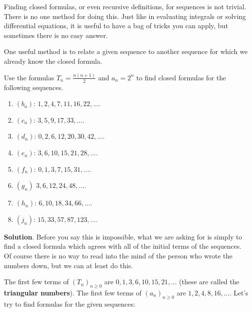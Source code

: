 \documentclass[11pt,]{book}
\newcommand{\terminology}[1]{\textbf{#1}}
\theoremstyle{ptxplainnotitle}
\theoremstyle{ptxplaintitle}
\theoremstyle{ptxdefinitionnotitle}
\theoremstyle{ptxdefinitiontitle}
\theoremstyle{ptxdefinitionnotitle}
\theoremstyle{ptxdefinitiontitle}
\theoremstyle{ptxdefinitionnotitle}
\theoremstyle{ptxdefinitiontitle}
\theoremstyle{ptxdefinitiontitlenonumber}
\theoremstyle{ptxdefinitiontitlenonumber}
\numberwithin{equation}{chapter}
\begin{document}
\hypertarget{p-57}{}%
Finding closed formulas, or even recursive definitions, for sequences is not trivial. There is no one method for doing this. Just like in evaluating integrals or solving differential equations, it is useful to have a bag of tricks you can apply, but sometimes there is no easy answer.%
\par
\hypertarget{p-58}{}%
One useful method is to relate a given sequence to another sequence for which we already know the closed formula.%
\begin{example}\label{example-4}
\hypertarget{p-59}{}%
Use the formulas \(T_n = \frac{n(n+1)}{2}\) and \(a_n = 2^n\) to find closed formulas for the following sequences. \leavevmode%
\begin{enumerate}
\item\hypertarget{li-34}{}\hypertarget{p-60}{}%
\((b_n)\): \(1, 2, 4, 7, 11, 16, 22, \ldots \).%
\item\hypertarget{li-35}{}\hypertarget{p-61}{}%
\((c_n)\): \(3, 5, 9, 17, 33,\ldots \).%
\item\hypertarget{li-36}{}\hypertarget{p-62}{}%
\((d_n)\): \(0, 2, 6, 12, 20, 30, 42,\ldots \).%
\item\hypertarget{li-37}{}\hypertarget{p-63}{}%
\((e_n)\): \(3, 6, 10, 15, 21, 28, \ldots\).%
\item\hypertarget{li-38}{}\hypertarget{p-64}{}%
\((f_n)\): \(0, 1, 3, 7, 15, 31, \ldots \).%
\item\hypertarget{li-39}{}\hypertarget{p-65}{}%
\((g_n)\) \(3, 6, 12, 24, 48, \ldots \).%
\item\hypertarget{li-40}{}\hypertarget{p-66}{}%
\((h_n)\): \(6, 10, 18, 34, 66, \ldots \).%
\item\hypertarget{li-41}{}\hypertarget{p-67}{}%
\((j_n)\): \(15, 33, 57, 87, 123, \ldots\).%
\end{enumerate}
%
\par\smallskip%
\noindent\textbf{Solution}.\hypertarget{solution-3}{}\quad%
\hypertarget{p-68}{}%
Before you say this is impossible, what we are asking for is simply to find a closed formula which agrees with all of the initial terms of the sequences. Of course there is no way to read into the mind of the person who wrote the numbers down, but we can at least do this.%
\par
\hypertarget{p-69}{}%
The first few terms of \((T_n)_{n\ge 0}\)\label{notation-2}
 are \(0, 1, 3, 6, 10, 15, 21, \ldots\) (these are called the \terminology{triangular numbers}). The first few terms of \((a_n)_{n\ge 0}\) are \(1, 2, 4, 8, 16, \ldots\).  Let's try to find formulas for the given sequences: \leavevmode%

\end{example}
\end{document}
